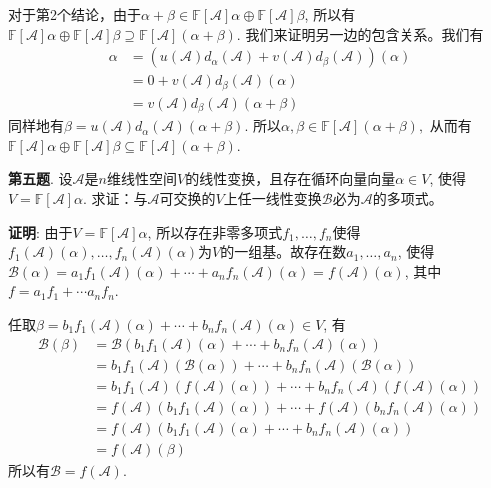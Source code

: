 对于第2个结论，由于$\alpha + \beta \in \mathbb{F}[\mathscr{A}]\alpha \oplus \mathbb{F}[\mathscr{A}]\beta$, 所以有$\mathbb{F}[\mathscr{A}]\alpha \oplus \mathbb{F}[\mathscr{A}]\beta \supseteq \mathbb{F}[\mathscr{A}](\alpha + \beta)$. 我们来证明另一边的包含关系。我们有
\begin{align*}
\alpha & = (u(\mathscr{A})d_{\alpha}(\mathscr{A}) + v(\mathscr{A})d_{\beta}(\mathscr{A})) (\alpha) \\
& = 0 + v(\mathscr{A})d_{\beta}(\mathscr{A}) (\alpha) \\
& = v(\mathscr{A})d_{\beta}(\mathscr{A}) (\alpha + \beta)
\end{align*}
同样地有$\beta = u(\mathscr{A})d_{\alpha}(\mathscr{A}) (\alpha + \beta)$. 所以$\alpha, \beta \in \mathbb{F}[\mathscr{A}](\alpha + \beta),$ 从而有$\mathbb{F}[\mathscr{A}]\alpha \oplus \mathbb{F}[\mathscr{A}]\beta \subseteq \mathbb{F}[\mathscr{A}](\alpha + \beta)$.


\newpageorvspace


{\bf 第五题}. 设$\mathscr{A}$是$n$维线性空间$V$的线性变换，且存在循环向量向量$\alpha \in V$, 使得$V = \mathbb{F}[\mathscr{A}]\alpha$. 求证：与$\mathscr{A}$可交换的$V$上任一线性变换$\mathscr{B}$必为$\mathscr{A}$的多项式。

\newpageorvspace

{\bf 证明}: 由于$V = \mathbb{F}[\mathscr{A}]\alpha$, 所以存在非零多项式$f_1, \ldots, f_n$使得$f_1(\mathscr{A})(\alpha), \ldots, f_n(\mathscr{A})(\alpha)$为$V$的一组基。故存在数$a_1, \ldots, a_n$, 使得$\mathscr{B}(\alpha) = a_1 f_1(\mathscr{A})(\alpha) + \cdots + a_n f_n(\mathscr{A})(\alpha) = f(\mathscr{A})(\alpha)$, 其中$f = a_1 f_1 + \cdots a_n f_n$.

任取$\beta = b_1 f_1(\mathscr{A})(\alpha) + \cdots + b_n f_n(\mathscr{A})(\alpha) \in V$, 有
\begin{align*}
\mathscr{B} (\beta) & = \mathscr{B} (b_1 f_1(\mathscr{A})(\alpha) + \cdots + b_n f_n(\mathscr{A})(\alpha)) \\
& = b_1 f_1(\mathscr{A}) (\mathscr{B}(\alpha)) + \cdots + b_n f_n(\mathscr{A})(\mathscr{B}(\alpha)) \\
& = b_1 f_1(\mathscr{A}) (f(\mathscr{A})(\alpha)) + \cdots + b_n f_n(\mathscr{A})(f(\mathscr{A})(\alpha)) \\
& = f(\mathscr{A})(b_1 f_1(\mathscr{A})(\alpha)) + \cdots + f(\mathscr{A})(b_n f_n(\mathscr{A})(\alpha)) \\
& = f(\mathscr{A}) (b_1 f_1(\mathscr{A})(\alpha) + \cdots + b_n f_n(\mathscr{A})(\alpha)) \\
& = f(\mathscr{A}) (\beta)
\end{align*}
所以有$\mathscr{B} = f(\mathscr{A})$.


